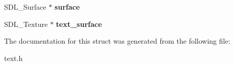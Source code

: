 \begin{DoxyCompactItemize}
\item 
\hypertarget{structERPG__Text__Element_a66a90acd246f8d6f676767257a6ddb65}{S\-D\-L\-\_\-\-Surface $\ast$ {\bfseries surface}}\label{structERPG__Text__Element_a66a90acd246f8d6f676767257a6ddb65}

\item 
\hypertarget{structERPG__Text__Element_aa1a5ddad89e492e9e81f9db6d3be1069}{S\-D\-L\-\_\-\-Texture $\ast$ {\bfseries text\-\_\-surface}}\label{structERPG__Text__Element_aa1a5ddad89e492e9e81f9db6d3be1069}

\end{DoxyCompactItemize}


The documentation for this struct was generated from the following file\-:\begin{DoxyCompactItemize}
\item 
text.\-h\end{DoxyCompactItemize}
